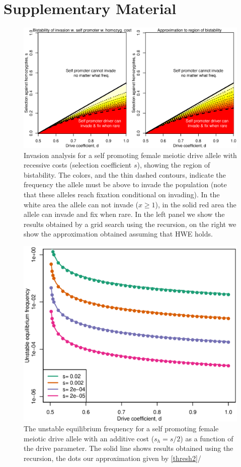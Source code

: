 \documentclass[12pt,letterpaper]{article}
\begin{document}
\section*{Supplementary Material}


\begin{figure}

\includegraphics[width = 0.5
          \textwidth]{../Scripts/homozyg_bistability.eps}
\caption{Invasion analysis for a self promoting female meiotic drive allele with
  recessive costs (selection coefficient $s$), showing the region of
  bistability. The colors, and the thin dashed contours, indicate the
  frequency the allele must be above to invade the population (note
  that these alleles reach fixation conditional on invading). In the
  white area the allele can not invade ($x \geq1$), in the solid red
  area the allele can invade and fix when rare. In the left panel we
  show the results obtained by a grid search using the recursion, on
  the right we show the approximation obtained assuming that HWE
  holds. }  
\label{Bistab_homozyg_cost_fig}
\end{figure}

\begin{figure}
\includegraphics[width = 0.8 \textwidth]{Figures/bistable_x_vs_d_additive_s.eps} 
\caption{The unstable equilibrium frequency for a self promoting
  female meiotic drive allele with an additive cost ($s_h=s/2$) as a
  function of the drive parameter. The solid line shows results
  obtained using the recursion, the dots our approximation given by \eqref{thresh2}/}  \label{bistable_additive}
\end{figure}
\end{document}
